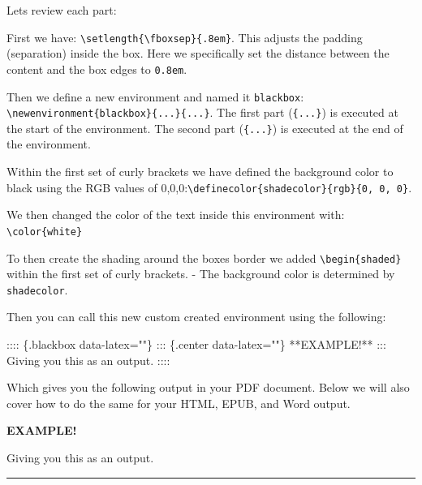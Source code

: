 \documentclass[
]{book}
\newenvironment{Shaded}{\begin{snugshade}}{\end{snugshade}}
\newcommand{\NormalTok}[1]{#1}
\newenvironment{blackbox}{
  \definecolor{shadecolor}{rgb}{0, 0, 0}
  \color{white}
  \begin{shaded}
  }
 {\end{shaded}}
\theoremstyle{definition}
\theoremstyle{definition}
\theoremstyle{definition}
\theoremstyle{definition}
\theoremstyle{remark}
\begin{document}
Lets review each part:

First we have: \texttt{\textbackslash{}setlength\{\textbackslash{}fboxsep\}\{.8em\}}. This adjusts the padding (separation) inside the box. Here we specifically set the distance between the content and the box edges to \texttt{0.8em}.

Then we define a new environment and named it \texttt{blackbox}: \texttt{\textbackslash{}newenvironment\{blackbox\}\{...\}\{...\}}. The first part (\texttt{\{...\}}) is executed at the start of the environment. The second part (\texttt{\{...\}}) is executed at the end of the environment.

Within the first set of curly brackets we have defined the background color to black using the RGB values of 0,0,0:\texttt{\textbackslash{}definecolor\{shadecolor\}\{rgb\}\{0,\ 0,\ 0\}}.

We then changed the color of the text inside this environment with: \texttt{\textbackslash{}color\{white\}}

To then create the shading around the boxes border we added \texttt{\textbackslash{}begin\{shaded\}} within the first set of curly brackets.
- The background color is determined by \texttt{shadecolor}.

Then you can call this new custom created environment using the following:

\begin{Shaded}
\begin{Highlighting}[]
\NormalTok{:::: \{.blackbox data{-}latex=""\}}
\NormalTok{::: \{.center data{-}latex=""\}}
\NormalTok{**EXAMPLE!**}
\NormalTok{:::}
\NormalTok{Giving you this as an output.}
\NormalTok{::::}
\end{Highlighting}
\end{Shaded}

Which gives you the following output in your PDF document. Below we will also cover how to do the same for your HTML, EPUB, and Word output.

\begin{blackbox}

\begin{center}
\textbf{EXAMPLE!}

\end{center}

Giving you this as an output.

\end{blackbox}

\begin{center}\rule{0.5\linewidth}{0.5pt}\end{center}
\end{document}
